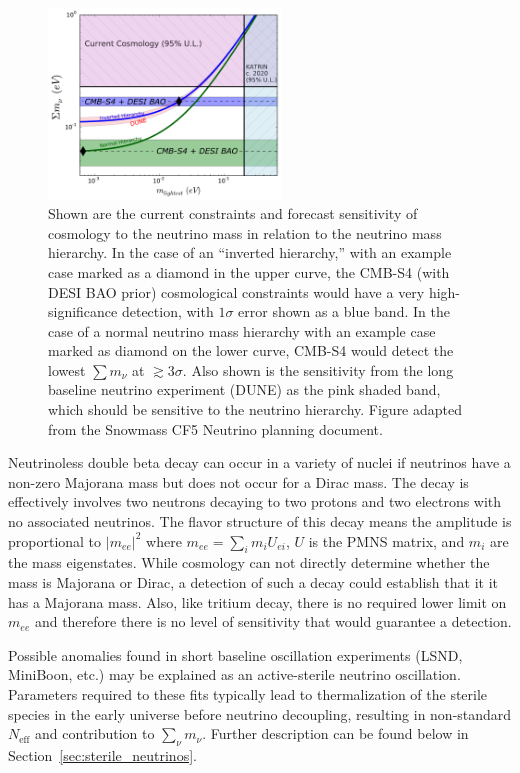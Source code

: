  \begin{figure}[h!]
\centering \includegraphics[width=0.55\textwidth]{Neutrinos/numass_combine_dune}
\caption{Shown are the current constraints and forecast sensitivity of
  cosmology to the neutrino mass in relation to the neutrino mass
  hierarchy.  In the case of an ``inverted hierarchy,'' with an
  example case marked as a diamond in the upper curve, the CMB-S4 (with DESI BAO prior)
  cosmological constraints would have a very high-significance
  detection, with $1\sigma$ error shown as a blue band.  In the case
  of a normal neutrino mass hierarchy with an example case marked as
  diamond on the lower curve, CMB-S4 would detect the lowest
  $\sum m_\nu$ at $\gtrsim 3 \sigma$. Also shown is the
  sensitivity from the long baseline neutrino experiment (DUNE) as the
  pink shaded band, which should be sensitive to the neutrino
  hierarchy. Figure adapted from the Snowmass CF5 Neutrino planning document.
 }
\label{fig:neutrino-noose}
\end{figure}

Neutrinoless double beta decay can occur in a variety of nuclei if neutrinos have a non-zero Majorana mass but does not occur for a Dirac mass.  The decay is effectively involves two neutrons decaying to two protons and two electrons with no associated neutrinos.  The flavor structure of this decay means the amplitude is proportional to $|m_{ee}|^2$ where $m_{ee} = \sum_i m_i U_{ei}$, $U$ is the PMNS matrix, and $m_i$ are the mass eigenstates.  While cosmology can not directly determine whether the mass is Majorana or Dirac, a detection of such a decay could establish that it it has a Majorana mass.  Also, like tritium decay, there is no required lower limit on $m_{ee}$ and therefore there is no level of sensitivity that would guarantee a detection.

Possible anomalies found in short baseline oscillation experiments (LSND,
MiniBoon, etc.) may be explained as an active-sterile neutrino
oscillation.  Parameters required to these fits typically lead to
thermalization of the sterile species in the early universe before
neutrino decoupling, resulting in non-standard $N_\mathrm{eff}$ and
contribution to $\sum_\nu m_\nu$.  Further description can be found
below in Section~\ref{sec:sterile_neutrinos}.

